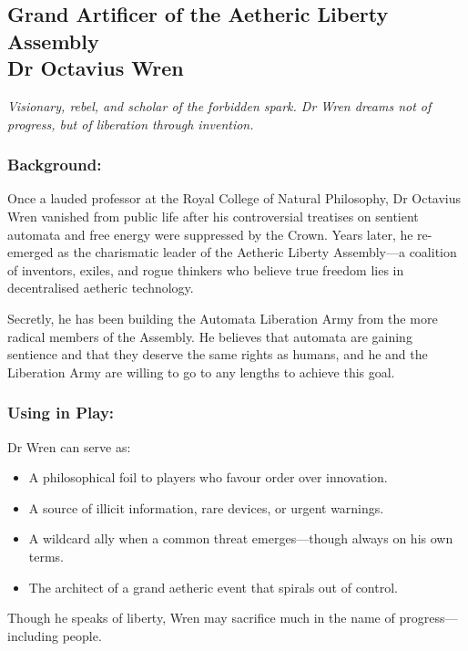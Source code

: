     \subsection{{\small Grand Artificer of the Aetheric Liberty Assembly}\\ Dr Octavius Wren}
\label{npc:octavius-wren}

    \emph{Visionary, rebel, and scholar of the forbidden spark. Dr Wren dreams not of progress, but of liberation through invention.}
    \vspace{.5\baselineskip}
  
    \begin{paracol}{3}
    \subsubsection*{Background:}
    Once a lauded professor at the Royal College of Natural Philosophy, Dr Octavius Wren vanished from public life after his controversial treatises on sentient automata and free energy were suppressed by the Crown. Years later, he re-emerged as the charismatic leader of the Aetheric Liberty Assembly—a coalition of inventors, exiles, and rogue thinkers who believe true freedom lies in decentralised aetheric technology.

    Secretly, he has been building the Automata Liberation Army from the more radical members of the Assembly. He believes that automata are gaining sentience and that they deserve the same rights as humans, and he and the Liberation Army are willing to go to any lengths to achieve this goal.

    \switchcolumn
    \subsubsection*{Using in Play:}
    Dr Wren can serve as:
    \begin{itemize}
      \item A philosophical foil to players who favour order over innovation.
      \item A source of illicit information, rare devices, or urgent warnings.
      \item A wildcard ally when a common threat emerges—though always on his own terms.
      \item The architect of a grand aetheric event that spirals out of control.
    \end{itemize}
    Though he speaks of liberty, Wren may sacrifice much in the name of progress—including people.


\end{paracol}
